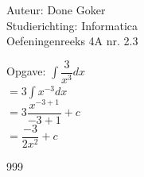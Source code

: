 \documentclass[a4paper]{article}
\begin{document}
  
\noindent \large Auteur: Done Goker \\
\noindent \large Studierichting: Informatica\\
\noindent \large Oefeningenreeks 4A nr. 2.3\\

\medskip

\normalsize

Opgave:
$\displaystyle\int \dfrac{3}{x^3}dx$ \\

$= 3\displaystyle\int x^{-3}dx$ \\

$= 3 \dfrac{x^{-3 + 1}}{-3 + 1} + c$ \\

$= \dfrac{-3}{2x^2} + c$ \\




\begin{thebibliography}{999}
\end{thebibliography}
\end{document}
